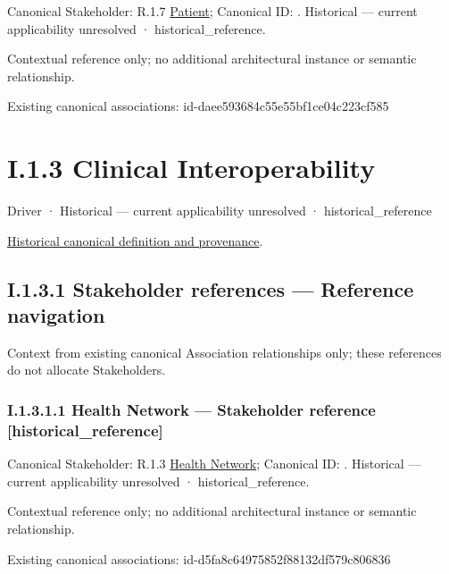 {\small Canonical Stakeholder: R.1.7 \hyperref[element:5f6d333e94634420b8a8bbf8b9cb6e2a]{Patient}; Canonical ID: \texttt{}. Historical — current applicability unresolved · historical\_reference.}\par
Contextual reference only; no additional architectural instance or semantic relationship.\par
Existing canonical associations: id-daee593684c55e55bf1ce04c223cf585\par
\section*{I.1.3 Clinical Interoperability}
\label{navigation:I.1.3}

\label{element:babb9f5d63d8435890c1db3579ec78d9}
{\small Driver · Historical — current applicability unresolved · historical\_reference}\par
\href{../../../../continuum/motivation/driver/babb9f5d63d8435890c1db3579ec78d9.md}{Historical canonical definition and provenance}.\par
\subsection*{I.1.3.1 Stakeholder references — Reference navigation}
\label{navigation:I.1.3.1}

Context from existing canonical Association relationships only; these references do not allocate Stakeholders.\par
\subsubsection*{I.1.3.1.1 Health Network — Stakeholder reference [historical\_reference]}
\label{navigation:I.1.3.1.1}

{\small Canonical Stakeholder: R.1.3 \hyperref[element:55e57c01dfe146a2a225228b31196862]{Health Network}; Canonical ID: \texttt{}. Historical — current applicability unresolved · historical\_reference.}\par
Contextual reference only; no additional architectural instance or semantic relationship.\par
Existing canonical associations: id-d5fa8c64975852f88132df579c806836\par
